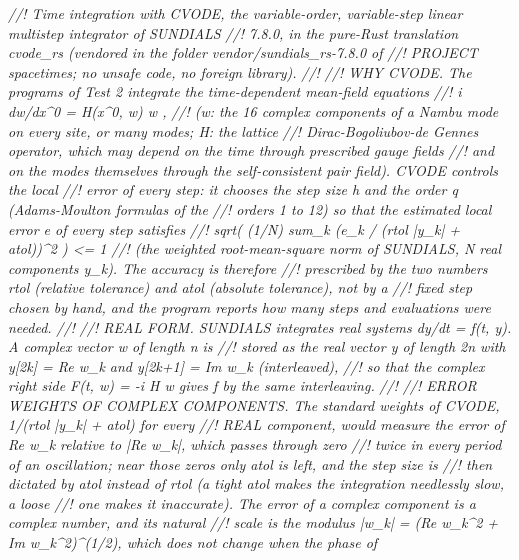 \documentclass[
  10pt,
]{article}
\newenvironment{Shaded}{}{}
\newcommand{\CommentTok}[1]{\textcolor[rgb]{0.38,0.63,0.69}{\textit{#1}}}
\begin{document}
\begin{Shaded}
\begin{Highlighting}[]
\CommentTok{//! Time integration with CVODE, the variable{-}order, variable{-}step linear multistep integrator of SUNDIALS}
\CommentTok{//! 7.8.0, in the pure{-}Rust translation \textasciigrave{}cvode\_rs\textasciigrave{} (vendored in the folder vendor/sundials\_rs{-}7.8.0 of}
\CommentTok{//! PROJECT spacetimes; no unsafe code, no foreign library).}
\CommentTok{//!}
\CommentTok{//! WHY CVODE.  The programs of Test 2 integrate the time{-}dependent mean{-}field equations}
\CommentTok{//!     i dw/dx\^{}0 = H(x\^{}0, w) w ,}
\CommentTok{//! (w: the 16 complex components of a Nambu mode on every site, or many modes; H: the lattice}
\CommentTok{//! Dirac{-}Bogoliubov{-}de Gennes operator, which may depend on the time through prescribed gauge fields}
\CommentTok{//! and on the modes themselves through the self{-}consistent pair field).  CVODE controls the local}
\CommentTok{//! error of every step: it chooses the step size h and the order q (Adams{-}Moulton formulas of the}
\CommentTok{//! orders 1 to 12) so that the estimated local error e of every step satisfies}
\CommentTok{//!     sqrt( (1/N) sum\_k (e\_k / (rtol |y\_k| + atol))\^{}2 ) \textless{}= 1}
\CommentTok{//! (the weighted root{-}mean{-}square norm of SUNDIALS, N real components y\_k).  The accuracy is therefore}
\CommentTok{//! prescribed by the two numbers rtol (relative tolerance) and atol (absolute tolerance), not by a}
\CommentTok{//! fixed step chosen by hand, and the program reports how many steps and evaluations were needed.}
\CommentTok{//!}
\CommentTok{//! REAL FORM.  SUNDIALS integrates real systems dy/dt = f(t, y).  A complex vector w of length n is}
\CommentTok{//! stored as the real vector y of length 2n with y[2k] = Re w\_k and y[2k+1] = Im w\_k (interleaved),}
\CommentTok{//! so that the complex right side F(t, w) = {-}i H w gives f by the same interleaving.}
\CommentTok{//!}
\CommentTok{//! ERROR WEIGHTS OF COMPLEX COMPONENTS.  The standard weights of CVODE, 1/(rtol |y\_k| + atol) for every}
\CommentTok{//! REAL component, would measure the error of Re w\_k relative to |Re w\_k|, which passes through zero}
\CommentTok{//! twice in every period of an oscillation; near those zeros only atol is left, and the step size is}
\CommentTok{//! then dictated by atol instead of rtol (a tight atol makes the integration needlessly slow, a loose}
\CommentTok{//! one makes it inaccurate).  The error of a complex component is a complex number, and its natural}
\CommentTok{//! scale is the modulus |w\_k| = (Re w\_k\^{}2 + Im w\_k\^{}2)\^{}(1/2), which does not change when the phase of}

\end{Highlighting}
\end{Shaded}
\end{document}
